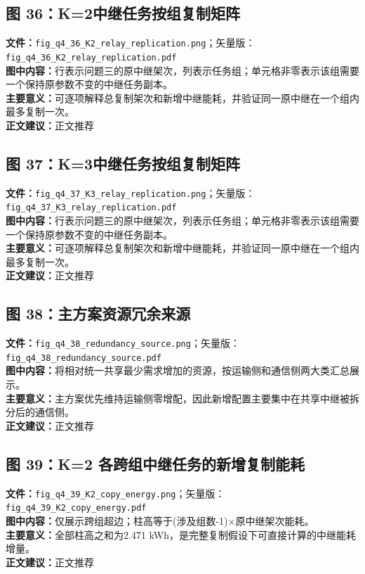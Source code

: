 \subsection*{图 36：K=2中继任务按组复制矩阵}
\textbf{文件：}\texttt{fig\_q4\_36\_K2\_relay\_replication.png}；矢量版：\texttt{fig\_q4\_36\_K2\_relay\_replication.pdf}\\
\textbf{图中内容：}行表示问题三的原中继架次，列表示任务组；单元格非零表示该组需要一个保持原参数不变的中继任务副本。\\
\textbf{主要意义：}可逐项解释总复制架次和新增中继能耗，并验证同一原中继在一个组内最多复制一次。\\
\textbf{正文建议：}正文推荐

\subsection*{图 37：K=3中继任务按组复制矩阵}
\textbf{文件：}\texttt{fig\_q4\_37\_K3\_relay\_replication.png}；矢量版：\texttt{fig\_q4\_37\_K3\_relay\_replication.pdf}\\
\textbf{图中内容：}行表示问题三的原中继架次，列表示任务组；单元格非零表示该组需要一个保持原参数不变的中继任务副本。\\
\textbf{主要意义：}可逐项解释总复制架次和新增中继能耗，并验证同一原中继在一个组内最多复制一次。\\
\textbf{正文建议：}正文推荐

\subsection*{图 38：主方案资源冗余来源}
\textbf{文件：}\texttt{fig\_q4\_38\_redundancy\_source.png}；矢量版：\texttt{fig\_q4\_38\_redundancy\_source.pdf}\\
\textbf{图中内容：}将相对统一共享最少需求增加的资源，按运输侧和通信侧两大类汇总展示。\\
\textbf{主要意义：}主方案优先维持运输侧零增配，因此新增配置主要集中在共享中继被拆分后的通信侧。\\
\textbf{正文建议：}正文推荐

\subsection*{图 39：K=2 各跨组中继任务的新增复制能耗}
\textbf{文件：}\texttt{fig\_q4\_39\_K2\_copy\_energy.png}；矢量版：\texttt{fig\_q4\_39\_K2\_copy\_energy.pdf}\\
\textbf{图中内容：}仅展示跨组超边；柱高等于(涉及组数-1)×原中继架次能耗。\\
\textbf{主要意义：}全部柱高之和为2.471 kWh，是完整复制假设下可直接计算的中继能耗增量。\\
\textbf{正文建议：}正文推荐


